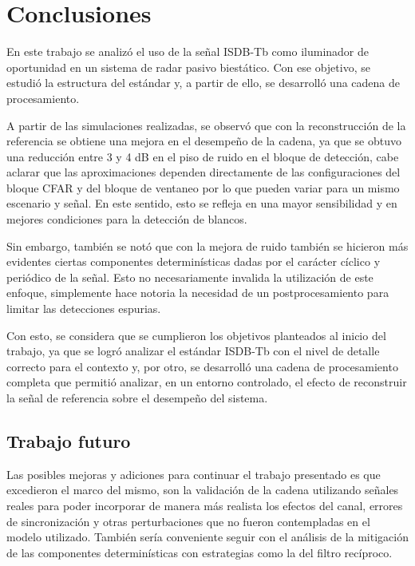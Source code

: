 \chapter{Conclusiones}

En este trabajo se analizó el uso de la señal ISDB-Tb como iluminador de oportunidad en un sistema de radar pasivo biestático. Con ese objetivo, se estudió la estructura del estándar y, a partir de ello, se desarrolló una cadena de procesamiento.

A partir de las simulaciones realizadas, se observó que con la reconstrucción de la referencia se obtiene una mejora en el desempeño de la cadena, ya que se obtuvo una reducción entre 3 y 4 dB en el piso de ruido en el bloque de detección, cabe aclarar que las aproximaciones dependen directamente de las configuraciones del bloque CFAR y del bloque de ventaneo por lo que pueden variar para un mismo escenario y señal. En este sentido, esto se refleja en una mayor sensibilidad y en mejores condiciones para la detección de blancos.

Sin embargo, también se notó que con la mejora de ruido también se hicieron más evidentes ciertas componentes determinísticas dadas por el carácter cíclico y periódico de la señal. Esto no necesariamente invalida la utilización de este enfoque, simplemente hace notoria la necesidad de un postprocesamiento para limitar las detecciones espurias.

Con esto, se considera que se cumplieron los objetivos planteados al inicio del trabajo, ya que se logró analizar el estándar ISDB-Tb con el nivel de detalle correcto para el contexto y, por otro, se desarrolló una cadena de procesamiento completa que permitió analizar, en un entorno controlado, el efecto de reconstruir la señal de referencia sobre el desempeño del sistema.

\section{Trabajo futuro}

Las posibles mejoras y adiciones para continuar el trabajo presentado es que excedieron el marco del mismo, son la validación de la cadena utilizando señales reales para poder incorporar de manera más realista los efectos del canal, errores de sincronización y otras perturbaciones que no fueron contempladas en el modelo utilizado. También sería conveniente seguir con el análisis de la mitigación de las componentes determinísticas con estrategias como la del filtro recíproco.

